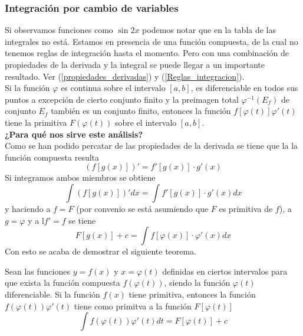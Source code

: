 \documentclass[10pt,twoside]{SelfArx} %
\begin{document}
 \subsubsection{Integración por cambio de variables}
 Si observamos funciones como $ \sin 2x $ podemos notar que en la tabla de las integrales no est\'a. Estamos en presencia de una función compuesta, de la cual no tenemos reglas de integración hasta el momento. Pero con una combinación de propiedades de la derivada y la integral se puede llegar a un importante resultado. Ver (\ref{propiedades_derivadas}) y (\ref{Reglas_integracion}).\\
 Si la función $ \varphi $ es continua sobre el intervalo $ [a,b] $, es diferenciable en todos sus puntos a excepción de cierto conjunto finito y la preimagen total $ \varphi^{-1}(E_{f}) $ de conjunto $ E_{f} $ también es un conjunto finito, entonces la función $ f[\varphi (t)]\varphi'(t) $ tiene la primitiva $ F(\varphi(t)) $ sobre el intervalo $ [a,b] $.\\
\textbf{ ¿Para qué nos sirve este análisis?}\\
 Como se han podido percatar de las propiedades de la derivada se tiene que la  la función compuesta resulta 
 \[ \displaystyle(f[g(x)])'=f'[g(x)] \cdot g'(x) \]
 Si integramos ambos miembros se obtiene
 \begin{equation}
 \displaystyle\int(f[g(x)])'dx=\int f'[g(x)] \cdot g'(x)dx
 \end{equation}
 y haciendo a $ f=F $ (por convenio se está asumiendo que $ F $ es primitiva de $ f $), a $ g=\varphi $ y a l$ f'=f $ se tiene
 \begin{equation}
 \displaystyle F[g(x)]+c=\int f[\varphi(x)] \cdot \varphi'(x)dx
 \end{equation}
 Con esto se acaba de demostrar el siguiente teorema.
 \begin{teorema}
 	Sean las funciones $ y=f(x) $ y $ x=\varphi(t) $ definidas en ciertos intervalos para que exista la función
 	compuesta $ f(\varphi(t)) $, siendo la función  $ \varphi(t) $ diferenciable. Si la función $ f(x) $ tiene primitiva, entonces la función $ f(\varphi(t))\varphi'(t) $ tiene como primitva a la funci\'on $ F[\varphi(t)] $
 	\begin{equation}
 	\displaystyle\int f(\varphi(t))\varphi'(t)dt=F[\varphi(t)]+c
 	\end{equation}
 \end{teorema}
\end{document}
